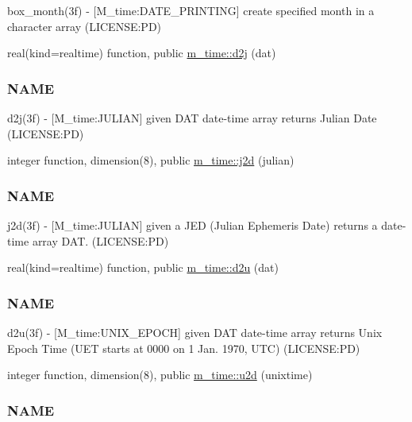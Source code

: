 \begin{DoxyCompactItemize}
\begin{DoxyCompactList}
box\+\_\+month(3f) -\/ \mbox{[}M\+\_\+time\+:D\+A\+T\+E\+\_\+\+P\+R\+I\+N\+T\+I\+NG\mbox{]} create specified month in a character array (L\+I\+C\+E\+N\+SE\+:PD) \end{DoxyCompactList}\item 
real(kind=realtime) function, public \mbox{\hyperlink{namespacem__time_a3fccc53c2650104eff084c7998d18f54}{m\+\_\+time\+::d2j}} (dat)
\begin{DoxyCompactList}\small\item\em \subsubsection*{N\+A\+ME}

d2j(3f) -\/ \mbox{[}M\+\_\+time\+:J\+U\+L\+I\+AN\mbox{]} given D\+AT date-\/time array returns Julian Date (L\+I\+C\+E\+N\+SE\+:PD) \end{DoxyCompactList}\item 
integer function, dimension(8), public \mbox{\hyperlink{namespacem__time_a3ad5cad6df02c53e0429c3602a072e3c}{m\+\_\+time\+::j2d}} (julian)
\begin{DoxyCompactList}\small\item\em \subsubsection*{N\+A\+ME}

j2d(3f) -\/ \mbox{[}M\+\_\+time\+:J\+U\+L\+I\+AN\mbox{]} given a J\+ED (Julian Ephemeris Date) returns a date-\/time array D\+AT. (L\+I\+C\+E\+N\+SE\+:PD) \end{DoxyCompactList}\item 
real(kind=realtime) function, public \mbox{\hyperlink{namespacem__time_a1506e2889a156387df4481ed0534be81}{m\+\_\+time\+::d2u}} (dat)
\begin{DoxyCompactList}\small\item\em \subsubsection*{N\+A\+ME}

d2u(3f) -\/ \mbox{[}M\+\_\+time\+:U\+N\+I\+X\+\_\+\+E\+P\+O\+CH\mbox{]} given D\+AT date-\/time array returns Unix Epoch Time (U\+ET starts at 0000 on 1 Jan. 1970, U\+TC) (L\+I\+C\+E\+N\+SE\+:PD) \end{DoxyCompactList}\item 
integer function, dimension(8), public \mbox{\hyperlink{namespacem__time_a083bc231f8ba1879d7f86ab424e77d6c}{m\+\_\+time\+::u2d}} (unixtime)
\begin{DoxyCompactList}\small\item\em \subsubsection*{N\+A\+ME}


\end{DoxyCompactList}
\end{DoxyCompactItemize}
